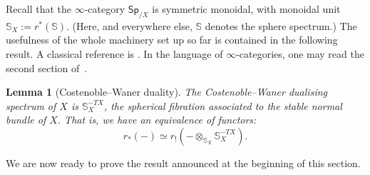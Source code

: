 \documentclass[a4paper]{amsart}
\newcommand{\bS}{\mathbb S}
\theoremstyle{plain}
\newtheorem{lemma}[theorem]{Lemma}
\theoremstyle{definition}
\newcommand{\catSp}{\mathsf{Sp}}
\begin{document}
Recall that the $\infty$-category $\catSp_{/X}$ is symmetric monoidal, with monoidal unit $\bS_X := r^*(\bS)$. (Here, and everywhere else, $\bS$ denotes the sphere spectrum.) The usefulness of the whole machinery set up so far is contained in the following result. A classical reference is \cite[Chapter 18]{may_parametrized_2006}. In the language of $\infty$-categories, one may read the second section of~\cite[Appendix A]{land_reducibility_2021}.
\begin{lemma}[Costenoble--Waner duality]\label{lemma:CostenobleWanerduality}
The Costenoble--Waner dualising spectrum of $X$ is $\bS_X^{-TX}$, the spherical fibration associated to the stable normal bundle of $X$. That is, we have an equivalence of functors:
\[
    r_*(-) \simeq r_!(- \otimes_{\bS_X} \bS_X^{-TX}).
\]
\end{lemma} 

We are now ready to prove the result announced at the beginning of this section.
\end{document}
